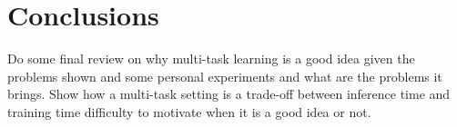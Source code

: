 \chapter{Conclusions}
Do some final review on why multi-task learning is a good idea given the problems shown and some personal experiments and what are the problems it brings.
Show how a multi-task setting is a trade-off between inference time and training time difficulty to motivate when it is a good idea or not.